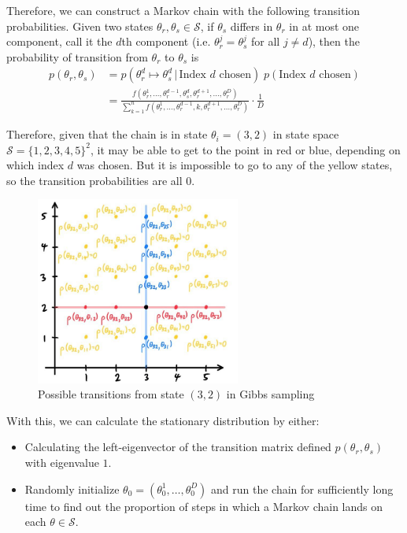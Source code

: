 \documentclass{article}
\begin{document}
  Therefore, we can construct a Markov chain with the following transition probabilities. Given two states $\theta_r, \theta_s \in \mathcal{S}$, if $\theta_s$ differs in $\theta_r$ in at most one component, call it the $d$th component (i.e. $\theta_r^j = \theta_s^j$ for all $j \neq d$), then the probability of transition from $\theta_r$ to $\theta_s$ is
  \begin{align*}
    p(\theta_r, \theta_s) & = p(\theta_r^d \mapsto \theta_{s}^d\,|\, \text{Index } d \text{ chosen})\; p (\text{Index } d \text{ chosen}) \\
    & = \frac{f(\theta_r^1, \ldots, \theta_r^{d-1}, \theta_s^d, \theta_r^{d+1}, \ldots, \theta_r^D)}{\sum_{k=1}^n f(\theta_r^1, \ldots, \theta_r^{d-1}, k, \theta_r^{d+1}, \ldots, \theta_r^D)} \cdot \frac{1}{D}
  \end{align*}

  Therefore, given that the chain is in state $\theta_i = (3, 2)$ in state space $\mathcal{S} = \{1, 2, 3, 4, 5\}^2$, it may be able to get to the point in red or blue, depending on which index $d$ was chosen. But it is impossible to go to any of the yellow states, so the transition probabilities are all $0$.

  \begin{figure}[H]
    \centering
    \includegraphics[width=0.6\textwidth]{img/prob_0.jpg}
    \caption{Possible transitions from state $(3,2)$ in Gibbs sampling}
  \end{figure}

  With this, we can calculate the stationary distribution by either:
  \begin{itemize}
    \item Calculating the left-eigenvector of the transition matrix defined $p(\theta_r, \theta_s)$ with eigenvalue $1$.
    \item Randomly initialize $\theta_0 = (\theta_0^1, \ldots, \theta_0^D)$ and run the chain for sufficiently long time to find out the proportion of steps in which a Markov chain lands on each $\theta \in \mathcal{S}$.
  \end{itemize}
\end{document}
